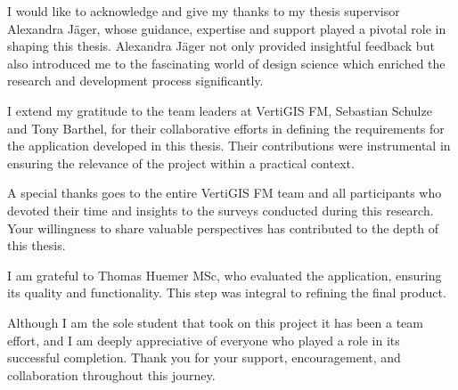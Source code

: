 \documentclass[
11pt, %
english, %
singlespacing, %
headsepline, %
]{MastersDoctoralThesis} %
\begin{document}
\begin{acknowledgements}
\addchaptertocentry{\acknowledgementname} %
I would like to acknowledge and give my thanks to my thesis supervisor Alexandra Jäger, whose guidance, expertise and support played a pivotal role in shaping this thesis.
Alexandra Jäger not only provided insightful feedback but also introduced me to the fascinating world of design science which enriched the research and development process significantly.

I extend my gratitude to the team leaders at VertiGIS FM, Sebastian Schulze and Tony Barthel, for their collaborative efforts in defining the requirements for the application developed in this thesis.
Their contributions were instrumental in ensuring the relevance of the project within a practical context.

A special thanks goes to the entire VertiGIS FM team and all participants who devoted their time and insights to the surveys conducted during this research.
Your willingness to share valuable perspectives has contributed to the depth of this thesis.

I am grateful to Thomas Huemer MSc, who evaluated the application, ensuring its quality and functionality.
This step was integral to refining the final product.

Although I am the sole student that took on this project it has been a team effort, and I am deeply appreciative of everyone who played a role in its successful completion.
Thank you for your support, encouragement, and collaboration throughout this journey. 
\end{acknowledgements}


\tableofcontents %

\listoffigures %

\listoftables %

\end{document}
